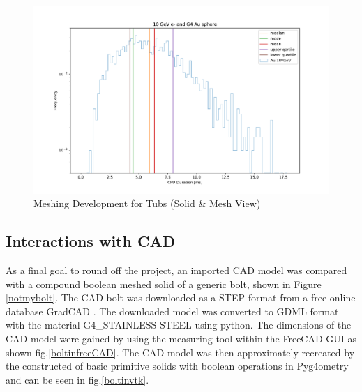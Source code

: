 \documentclass[12pt,a4paper]{article}
\begin{document}
\begin{figure}[h!]
\centering
\includegraphics[scale=0.4]{Images//Materials//Time_ex_dists.pdf}
\caption[width=\columnwidth]{Meshing Development for Tubs (Solid \& Mesh View)}
\label{tubspic}
\end{figure}

%
%

\subsection{Interactions with CAD}
As a final goal to round off the project, an imported CAD model was compared with a compound boolean meshed solid of a generic bolt, shown in Figure
\ref{notmybolt}. The CAD bolt was downloaded as a STEP format from a free online database GradCAD \cite{cadmag}. The downloaded model was converted to GDML format with the material G4\_STAINLESS-STEEL using python. The dimensions of the CAD model were gained by using the measuring tool within the FreeCAD GUI as shown fig.\ref{boltinfreeCAD}. The CAD model was then approximately recreated by the constructed of basic primitive solids with boolean operations in Pyg4ometry and can be seen in fig.\ref{boltinvtk}.
\end{document}
